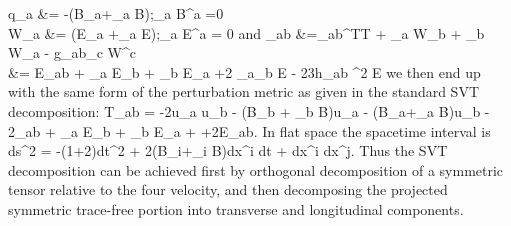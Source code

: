 \documentclass[10pt,letterpaper]{article}
\begin{document}
	q_a &= -(B_a+\del_a B);\qquad \del_a B^a =0\\
	W_a &= (E_a +\del_a E);\qquad \del_a E^a = 0
\ea
and 
\ba
	\pi_{ab} &=\pi_{ab}^{TT} +  \del_a W_b + \del_b W_a - g_{ab}\del_c W^c\\
	&= E_{ab} + \del_a E_b + \del_b E_a +2 \del_a\del_b E - \frac23h_{ab} \del^2 E
\ea
we then end up with the same form of the perturbation metric as given in the standard SVT decomposition:
\be
	T_{ab} = -2\phi u_a u_b - (B_b + \del_b B)u_a - (B_a+\del_a B)u_b - 2\gamma_{ab} \psi + \del_a E_b + \del _b E_a +
	+2E_{ab}.
\ee
In flat space the spacetime interval is 
\be
	ds^2 =  -(1+2\phi)dt^2 + 2(B_i+\del_i B)dx^i dt + dx^i dx^j.
\ee
Thus the SVT decomposition can be achieved first by orthogonal decomposition of a symmetric tensor relative to the four velocity, and then decomposing the projected symmetric trace-free portion into transverse and longitudinal components. 
\end{document}

